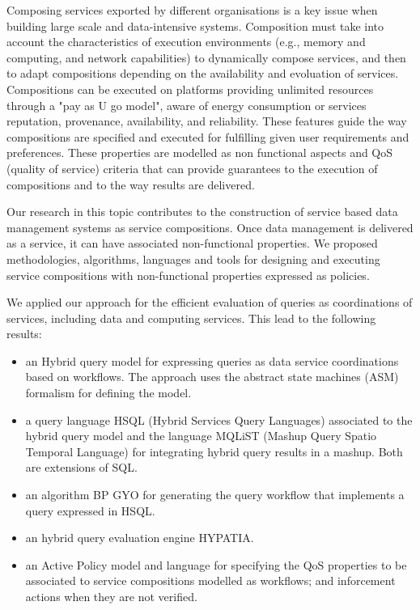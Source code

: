 Composing services  exported by different organisations is a key issue when building  large scale and data-intensive systems. 
Composition must take into account the characteristics of  execution environments (e.g., memory and computing, and network capabilities) to dynamically  compose  services, and then to adapt  compositions depending on the availability and evoluation of services. 
 Compositions can be executed  on platforms providing  unlimited resources through a "pay as U go model", aware of energy consumption or services reputation, provenance, availability, and reliability.  These features  guide the way compositions are specified and executed for fulfilling given user requirements and preferences. These properties are modelled as  non functional aspects and QoS (quality of service) criteria  that can provide guarantees to the execution of compositions and to the way results are delivered.

Our research in this topic contributes to the construction of service based data management systems as service compositions. Once data management is delivered as a service, it can have associated non-functional properties.
We proposed methodologies, algorithms, languages and tools for designing and executing  service compositions with non-functional properties expressed as policies. 

We  applied our approach for the efficient evaluation  of queries as coordinations of services, including data  and computing services.  
This lead to the following results: 
\begin{itemize}
\item  an Hybrid query model for expressing queries as data service coordinations based on workflows. The approach uses the abstract state machines (ASM) formalism for defining the model.

\item  a query language HSQL (Hybrid Services Query Languages) associated to the hybrid query model and the language MQLiST (Mashup Query Spatio Temporal Language) for integrating hybrid query results in a mashup. Both are extensions of SQL. 

\item  an algorithm BP GYO for generating the query workflow that implements a query expressed in HSQL.


\item an hybrid query evaluation engine HYPATIA.

\item an Active Policy model and language for specifying the QoS properties to be associated to service compositions modelled as workflows; and inforcement actions when they are not verified.

\end{itemize}



